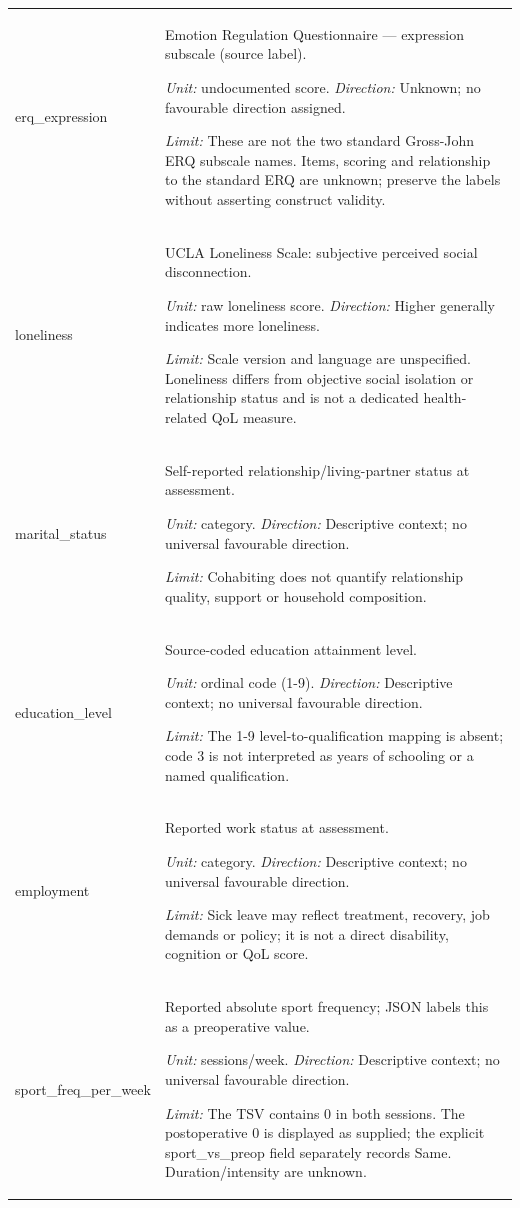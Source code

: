 \begin{longtable}{p{.22\linewidth}p{.70\linewidth}}
{\ttfamily\footnotesize erq\_\allowbreak{}expression} & Emotion Regulation Questionnaire --- expression subscale (source label).\par\textit{Unit:} undocumented score. \textit{Direction:} Unknown; no favourable direction assigned.\par\textit{Limit:} These are not the two standard Gross-John ERQ subscale names. Items, scoring and relationship to the standard ERQ are unknown; preserve the labels without asserting construct validity. \\[1pt]
{\ttfamily\footnotesize loneliness} & UCLA Loneliness Scale: subjective perceived social disconnection.\par\textit{Unit:} raw loneliness score. \textit{Direction:} Higher generally indicates more loneliness.\par\textit{Limit:} Scale version and language are unspecified. Loneliness differs from objective social isolation or relationship status and is not a dedicated health-related QoL measure. \\[1pt]
{\ttfamily\footnotesize marital\_\allowbreak{}status} & Self-reported relationship/living-partner status at assessment.\par\textit{Unit:} category. \textit{Direction:} Descriptive context; no universal favourable direction.\par\textit{Limit:} Cohabiting does not quantify relationship quality, support or household composition. \\[1pt]
{\ttfamily\footnotesize education\_\allowbreak{}level} & Source-coded education attainment level.\par\textit{Unit:} ordinal code (1-9). \textit{Direction:} Descriptive context; no universal favourable direction.\par\textit{Limit:} The 1-9 level-to-qualification mapping is absent; code 3 is not interpreted as years of schooling or a named qualification. \\[1pt]
{\ttfamily\footnotesize employment} & Reported work status at assessment.\par\textit{Unit:} category. \textit{Direction:} Descriptive context; no universal favourable direction.\par\textit{Limit:} Sick leave may reflect treatment, recovery, job demands or policy; it is not a direct disability, cognition or QoL score. \\[1pt]
{\ttfamily\footnotesize sport\_\allowbreak{}freq\_\allowbreak{}per\_\allowbreak{}week} & Reported absolute sport frequency; JSON labels this as a preoperative value.\par\textit{Unit:} sessions/week. \textit{Direction:} Descriptive context; no universal favourable direction.\par\textit{Limit:} The TSV contains 0 in both sessions. The postoperative 0 is displayed as supplied; the explicit sport\_vs\_preop field separately records Same. Duration/intensity are unknown. \\[1pt]

\end{longtable}
